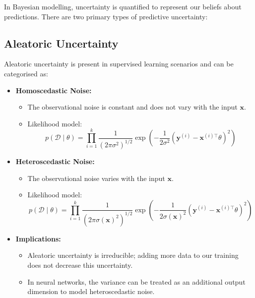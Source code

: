 In Bayesian modelling, uncertainty is quantified to represent our beliefs about predictions. There are two primary types of predictive uncertainty:



\subsection{Aleatoric Uncertainty}

Aleatoric uncertainty is present in supervised learning scenarios and can be categorised as:

\begin{itemize}
    \item \textbf{Homoscedastic Noise:}
    \begin{itemize}
        \item The observational noise is constant and does not vary with the input $\mathbf{x}$.
        \item Likelihood model:
        \[
        p(\mathcal{D} \mid \theta) = \prod_{i=1}^k \frac{1}{(2\pi\sigma^2)^{1/2}} \exp\left(-\frac{1}{2\sigma^2} (\mathbf{y}^{(i)} - \mathbf{x}^{(i)\top}\theta)^2 \right)
        \]
    \end{itemize}
    \item \textbf{Heteroscedastic Noise:}
    \begin{itemize}
        \item The observational noise varies with the input $\mathbf{x}$.
        \item Likelihood model:
        \[
        p(\mathcal{D} \mid \theta) = \prod_{i=1}^k \frac{1}{(2\pi\sigma(\mathbf{x})^2)^{1/2}} \exp\left(-\frac{1}{2\sigma(\mathbf{x})^2} (\mathbf{y}^{(i)} - \mathbf{x}^{(i)\top}\theta)^2 \right)
        \]
    \end{itemize}
    \item \textbf{Implications:}
    \begin{itemize}
        \item Aleatoric uncertainty is irreducible; adding more data to our training does not decrease this uncertainty.
        \item In neural networks, the variance can be treated as an additional output dimension to model heteroscedastic noise.
    \end{itemize}
\end{itemize}

